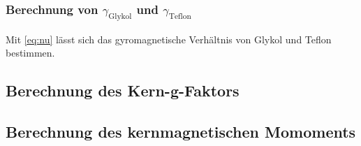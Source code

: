 \subsubsection{Berechnung von $\gamma_\text{Glykol}$ und $\gamma_\text{Teflon}$}
Mit \autoref{eq:nu} lässt sich das gyromagnetische Verhältnis von Glykol und Teflon bestimmen.

\subsection{Berechnung des Kern-g-Faktors}

\subsection{Berechnung des kernmagnetischen Momoments}